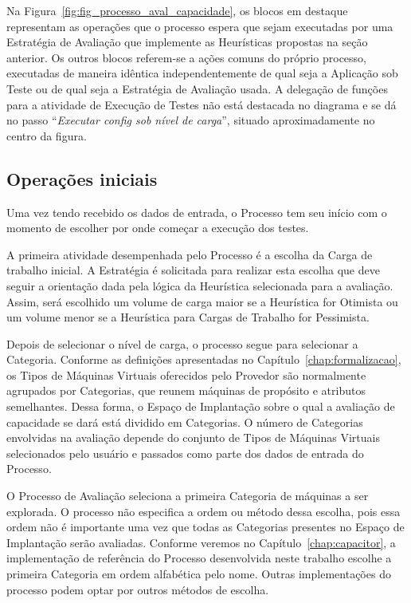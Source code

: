 Na Figura~\ref{fig:fig_processo_aval_capacidade}, os blocos em destaque representam
as operações que o processo espera que sejam executadas por uma Estratégia de 
Avaliação que implemente as Heurísticas propostas na seção anterior. Os outros 
blocos referem-se a ações comuns do próprio processo, executadas de maneira 
idêntica independentemente de qual seja a Aplicação sob Teste ou de qual seja a 
Estratégia de Avaliação usada. A delegação de funções para a atividade de Execução
de Testes não está destacada no diagrama e se dá no passo ``\emph{Executar
config sob nível de carga}'', situado aproximadamente no centro da figura.

\subsection{Operações iniciais}
\label{subsec:processo_operacoes_iniciais}
Uma vez tendo recebido os dados de entrada, o Processo tem seu início com o momento 
de escolher por onde começar a execução dos testes.

A primeira atividade desempenhada pelo Processo é a escolha da Carga de trabalho
inicial. A Estratégia é solicitada para realizar esta escolha que deve
seguir a orientação dada pela lógica da Heurística selecionada para 
a avaliação. Assim, será escolhido
um volume de carga maior se a Heurística for Otimista ou um volume menor se a
Heurística para Cargas de Trabalho for Pessimista. 

Depois de selecionar o nível de carga, o processo segue para selecionar a
Categoria. Conforme as definições apresentadas no
Capítulo~\ref{chap:formalizacao}, os Tipos de Máquinas Virtuais oferecidos pelo Provedor são normalmente agrupados 
por Categorias, que reunem máquinas de propósito e atributos semelhantes. Dessa
forma, o Espaço de Implantação sobre o qual a avaliação de capacidade se dará está 
dividido em Categorias. O número de Categorias envolvidas na avaliação depende do 
conjunto de Tipos de Máquinas Virtuais selecionados pelo usuário e passados como
parte dos dados de entrada do Processo.

O Processo de Avaliação seleciona a primeira
Categoria de máquinas a ser explorada. O processo não especifica a ordem ou método 
dessa escolha, pois essa ordem não é importante uma vez que todas as Categorias 
presentes no Espaço de Implantação serão avaliadas. Conforme veremos no 
Capítulo~\ref{chap:capacitor}, a implementação de referência do Processo 
desenvolvida neste trabalho escolhe a primeira Categoria em ordem alfabética pelo
nome. Outras implementações do processo podem optar por outros métodos de
escolha.



